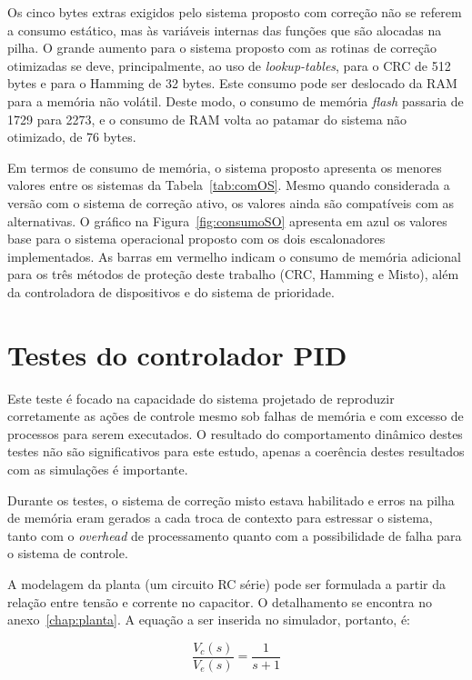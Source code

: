 \documentclass[12pt,openright,oneside,a4paper,brazil]{abntex2}
\begin{document}
Os cinco bytes extras exigidos pelo sistema proposto com correção não se referem a consumo estático, mas às variáveis internas das funções que são alocadas na pilha. O grande aumento para o sistema proposto com as rotinas de correção otimizadas se deve, principalmente, ao uso de \textit{lookup-tables}, para o CRC de 512 bytes e para o Hamming de 32 bytes. Este consumo pode ser deslocado da RAM para a memória não volátil. Deste modo, o consumo de memória \textit{flash} passaria de 1729 para 2273, e o consumo de RAM volta ao patamar do sistema não otimizado, de 76 bytes.

Em termos de consumo de memória, o sistema proposto apresenta os menores valores entre os sistemas da Tabela~\ref{tab:comOS}. Mesmo quando considerada a versão com o sistema de correção ativo, os valores ainda são compatíveis com as alternativas. O gráfico na Figura~\ref{fig:consumoSO} apresenta em azul os valores base para o sistema operacional proposto com os dois escalonadores implementados. As barras em vermelho indicam o consumo de memória adicional para os três métodos de proteção deste trabalho (CRC, Hamming e Misto), além da controladora de dispositivos e do sistema de prioridade.


\section{Testes do controlador PID}
  
Este teste é focado na capacidade do sistema projetado de reproduzir corretamente as ações de controle mesmo sob falhas de memória e com excesso de processos para serem executados. O resultado do comportamento dinâmico destes testes não são significativos para este estudo, apenas a coerência destes resultados com as simulações é importante.

Durante os testes, o sistema de correção misto estava habilitado e erros na pilha de memória eram gerados a cada troca de contexto para estressar o sistema, tanto com o \textit{overhead} de processamento quanto com a possibilidade de falha para o sistema de controle.

A modelagem da planta (um circuito RC série) pode ser formulada a partir da relação entre tensão e corrente no capacitor. O detalhamento se encontra no anexo~\ref{chap:planta}. A equação a ser inserida no simulador, portanto, é:

\begin{equation}
	  \frac{V_{c}(s)}{V_{e}(s)} = \frac{1}{s + 1}
\end{equation}
\end{document}
